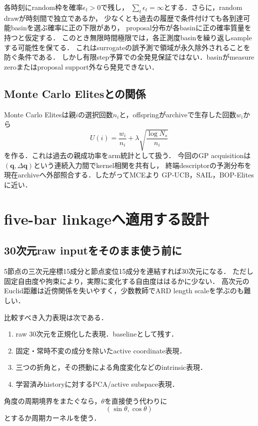 \documentclass[a4paper,11pt]{ltjsarticle}
\begin{document}
各時刻にrandom枠を確率\(\epsilon_t>0\)で残し，
\(\sum_t\epsilon_t=\infty\)とする．さらに，random drawが時刻間で独立であるか，
少なくとも過去の履歴で条件付けても各到達可能basinを選ぶ確率に正の下限があり，
proposal分布が各basinに正の確率質量を持つと仮定する．
このとき無限時間極限では，各正測度basinを繰り返しsampleする可能性を保てる．
これはsurrogateの誤予測で領域が永久除外されることを防ぐ条件である．
しかし有限step予算での全発見保証ではない．basinがmeasure zeroまたはproposal support外なら発見できない．

\subsection{Monte Carlo Elitesとの関係}

Monte Carlo Elitesは親\(i\)の選択回数\(n_i\)と，offspringがarchiveで生存した回数\(w_i\)から
\begin{equation}
  U(i)=\frac{w_i}{n_i}
  +\lambda\sqrt{\frac{\log N_s}{n_i}}
  \label{eq:mce-score}
\end{equation}
を作る\citep{sfikas2021mce}．これは過去の親成功率をarm統計として扱う．
今回のGP acquisitionは\((\bm q,\Delta\bm q)\)という連続入力間でkernel相関を共有し，
終端descriptorの予測分布を現在archiveへ外部照合する．したがってMCEより
GP-UCB，SAIL\citep{gaier2018sail}，BOP-Elites\citep{kent2024bopelites}に近い．

\section{five-bar linkageへ適用する設計}
\label{sec:fivebar-design}

\subsection{30次元raw inputをそのまま使う前に}

5節点の三次元座標15成分と節点変位15成分を連結すれば30次元になる．
ただし固定自由度や拘束により，実際に変化する自由度ははるかに少ない．
高次元のEuclid距離は近傍関係を失いやすく，少数教師でARD length scaleを学ぶのも難しい．

比較すべき入力表現は次である．
\begin{enumerate}
  \item raw 30次元を正規化した表現．baselineとして残す．
  \item 固定・常時不変の成分を除いたactive coordinate表現．
  \item 三つの折角と，その摂動による角度変化などのintrinsic表現．
  \item 学習済みhistoryに対するPCA/active subspace表現．
\end{enumerate}
角度の周期境界をまたぐなら，\(\theta\)を直接使う代わりに
\begin{equation}
  (\sin\theta,\cos\theta)
\end{equation}
とするか周期カーネルを使う．
\end{document}
